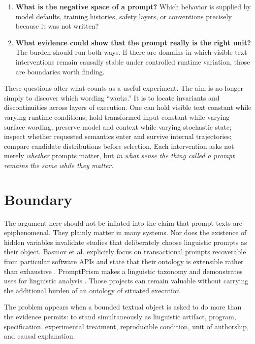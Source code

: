 \documentclass[11pt]{article}
\begin{document}
\begin{enumerate}[leftmargin=1.6em]
\item \textbf{What is the negative space of a prompt?} Which behavior is supplied by model defaults, training histories, safety layers, or conventions precisely because it was not written?

\item \textbf{What evidence could show that the prompt really is the right unit?} The burden should run both ways. If there are domains in which visible text interventions remain causally stable under controlled runtime variation, those are boundaries worth finding.
\end{enumerate}

These questions alter what counts as a useful experiment. The aim is no longer simply to discover which wording ``works.'' It is to locate invariants and discontinuities across layers of execution. One can hold visible text constant while varying runtime conditions; hold transformed input constant while varying surface wording; preserve model and context while varying stochastic state; inspect whether requested semantics enter and survive internal trajectories; compare candidate distributions before selection. Each intervention asks not merely \emph{whether} prompts matter, but \emph{in what sense the thing called a prompt remains the same while they matter}.

\section{Boundary}

The argument here should not be inflated into the claim that prompt texts are epiphenomenal. They plainly matter in many systems. Nor does the existence of hidden variables invalidate studies that deliberately choose linguistic prompts as their object. Basmov et al. explicitly focus on transactional prompts recoverable from particular software APIs and state that their ontology is extensible rather than exhaustive \citep{Basmov2026PromptsWild}. PromptPrism makes a linguistic taxonomy and demonstrates uses for linguistic analysis \citep{Jeoung2026PromptPrism}. Those projects can remain valuable without carrying the additional burden of an ontology of situated execution.

The problem appears when a bounded textual object is asked to do more than the evidence permits: to stand simultaneously as linguistic artifact, program, specification, experimental treatment, reproducible condition, unit of authorship, and causal explanation.
\end{document}
